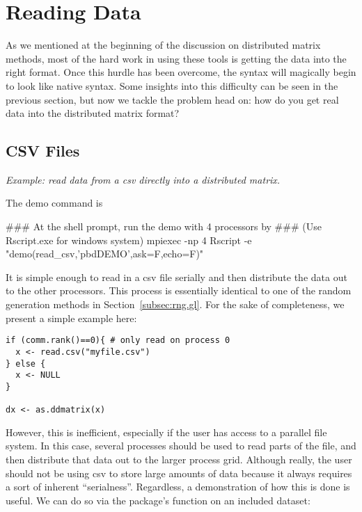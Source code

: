 \section{Reading Data}
\label{sec:reader}

As we mentioned at the beginning of the discussion on distributed matrix methods, most of the hard work in using these tools is getting the data into the right format.  Once this hurdle has been overcome, the syntax will magically begin to look like native  syntax.  Some insights into this difficulty can be seen in the previous section, but now we tackle the problem head on:  how do you get real data into the distributed matrix format?

\subsection{CSV Files}
\label{sec:csv_files}

\emph{Example:  read data from a csv directly into a distributed matrix.}

The demo command is
\begin{Command}
### At the shell prompt, run the demo with 4 processors by
### (Use Rscript.exe for windows system)
mpiexec -np 4 Rscript -e "demo(read_csv,'pbdDEMO',ask=F,echo=F)"
\end{Command}

It is simple enough to read in a csv file serially and then distribute the data out to the other processors.  This process is essentially identical to one of the random generation methods in Section~\ref{subsec:rng.gl}.  For the sake of completeness, we present a simple example here:

\begin{lstlisting}[language=rr]
if (comm.rank()==0){ # only read on process 0
  x <- read.csv("myfile.csv")
} else {
  x <- NULL
}

dx <- as.ddmatrix(x)
\end{lstlisting}

However, this is inefficient, especially if the user has access to a parallel file system.  In this case, several processes should be used to read parts of the file, and then distribute that data out to the larger process grid.  Although really, the user should not be using csv to store large amounts of data because it always requires a sort of inherent ``serialness''.  Regardless, a demonstration of how this is done is useful.  We can do so via the  package's function  on an included dataset:

